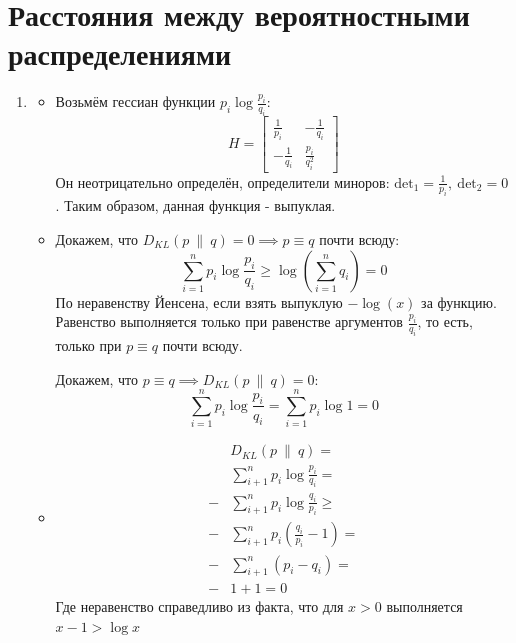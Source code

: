 \documentclass{article}
\begin{document}
\section{Расстояния между вероятностными распределениями}
\begin{enumerate}
    \item
          \begin{itemize}
              \item[(a)]
                  Возьмём гессиан функции $p_i \log{\frac{p_i}{q_i}}$:
                  $$
                      H =
                      \begin{bmatrix}
                          \frac{1}{p_i}  & -\frac{1}{q_i}    \\
                          -\frac{1}{q_i} & \frac{p_i}{q_i^2}
                      \end{bmatrix}
                  $$
                  Он неотрицательно определён, определители миноров: $\mathrm{det}_1 = \frac{1}{p_i}, \ \mathrm{det}_2 = 0$. Таким образом, данная функция - выпуклая.

              \item[(b)]
                  Докажем, что $D_{KL}(p \ \| \ q) = 0 \implies p \equiv q$ почти всюду:
                  $$
                      \sum_{i=1}^n p_i\log{\frac{p_i}{q_i}} \geq \log \left( \sum_{i=1}^n q_i \right) = 0
                  $$
                  По неравенству Йенсена, если взять выпуклую $-\log(x)$ за функцию. Равенство выполняется только при равенстве аргументов $\frac{p_i}{q_i}$, то есть, только при  $p \equiv q$ почти всюду.

                  Докажем, что $p \equiv q \implies D_{KL}(p \ \| \ q) = 0$:
                  $$
                      \sum_{i=1}^n p_i\log{\frac{p_i}{q_i}} = \sum_{i=1}^n p_i\log{1} = 0
                  $$

              \item[(c)]
                  \begin{align*}
                        & D_{KL}(p \ \| \ q) =                        \\
                        & \sum_{i+1}^n p_i \log{\frac{p_i}{q_i}} =    \\
                      - & \sum_{i+1}^n p_i \log{\frac{q_i}{p_i}} \geq \\
                      - & \sum_{i+1}^n p_i (\frac{q_i}{p_i} - 1) =    \\
                      - & \sum_{i+1}^n (p_i - q_i) =                  \\
                      - & 1 + 1 = 0
                  \end{align*}
                  Где неравенство справедливо из факта, что для $x > 0$ выполняется $x - 1 > \log{x}$


\end{itemize}
\end{enumerate}
\end{document}
